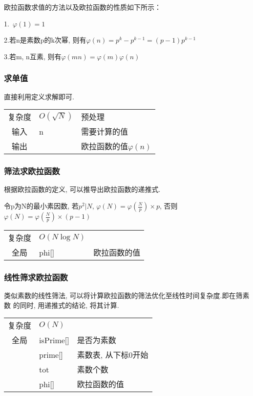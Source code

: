 欧拉函数求值的方法以及欧拉函数的性质如下所示：

1.\ $\varphi (1) = 1$

2.若n是素数p的k次幂, 则有$\varphi (n) = p^{k} - p^{k - 1} = (p - 1)p^{k - 1}$

3.若m, n互素, 则有$\varphi (mn)=\varphi (m)\varphi (n)$


        \subsubsection{求单值}\small
直接利用定义求解即可.

\begin{longtable}{|c|l|l|}
复杂度 & $O(\sqrt{N})$& 预处理 \\
输入 & n & 需要计算的值 \\
输出 & & 欧拉函数的值$\varphi (n)$ \\
\end{longtable}



        \subsubsection{筛法求欧拉函数}\small
根据欧拉函数的定义, 可以推导出欧拉函数的递推式.

令p为N的最小素因数, 若$p^2|N$, $\varphi (N) = \varphi(\frac{N}{p}) \times p$, 
否则$\varphi (N) = \varphi(\frac{N}{p}) \times (p-1)$

\begin{longtable}{|c|l|l|}
复杂度 & $O(N\log N)$ &  \\
全局 & phi[] & 欧拉函数的值 \\ 
\end{longtable}



        \subsubsection{线性筛求欧拉函数}\small
类似素数的线性筛法, 可以将计算欧拉函数的筛法优化至线性时间复杂度.即在筛素数
的同时, 用递推式的结论, 将其计算.

\begin{longtable}{|c|l|l|}
复杂度 & $O(N)$ &  \\
全局 & isPrime[] & 是否为素数 \\
 & prime[] & 素数表, 从下标0开始 \\
 & tot & 素数个数 \\
 & phi[] & 欧拉函数的值 \\ 
\end{longtable}



